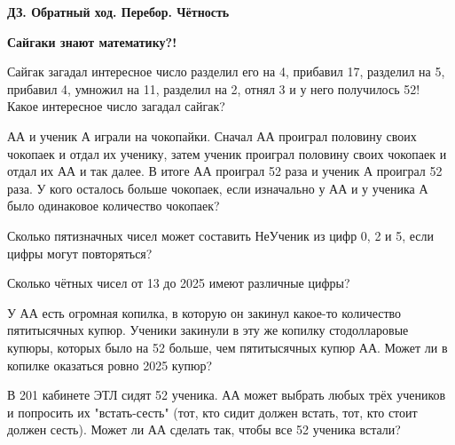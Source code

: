 \centerline{\bf \Huge ДЗ. Обратный ход. Перебор. Чётность}
\centerline{\bf \Huge }

\begin{flushright}
        \scriptsize{\textbf{Сайгаки знают математику?!}}
\end{flushright}

 Сайгак загадал интересное число разделил его на 4, прибавил 17, разделил на 5, прибавил 4, умножил на 11, разделил на 2, отнял 3 и у него получилось 52! Какое интересное число загадал сайгак?

 АА и ученик А играли на чокопайки. Сначал АА проиграл половину своих чокопаек и отдал их ученику, затем ученик проиграл половину своих чокопаек и отдал их АА и так далее. В итоге АА проиграл 52 раза и ученик А проиграл 52 раза. У кого осталось больше чокопаек, если изначально у АА и у ученика А было одинаковое количество чокопаек?

 Сколько пятизначных чисел может составить НеУченик из цифр 0, 2 и 5, если цифры могут повторяться?

 Сколько чётных чисел от 13 до 2025 имеют различные цифры?

 У АА есть огромная копилка, в которую он закинул какое-то количество пятитысячных купюр. Ученики закинули в эту же копилку стодолларовые купюры, которых было на 52 больше, чем пятитысячных купюр АА. Может ли в копилке оказаться ровно 2025 купюр?

 В 201 кабинете ЭТЛ сидят 52 ученика. АА может выбрать любых трёх учеников и попросить их "встать-сесть" (тот, кто сидит должен встать, тот, кто стоит должен сесть). Может ли АА сделать так, чтобы все 52 ученика встали?